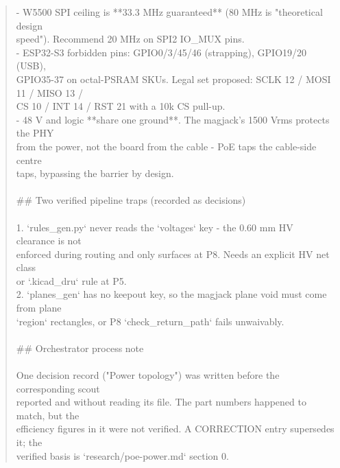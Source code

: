 \documentclass[11pt,a4paper]{article}
\begin{document}
\begin{quote}
- W5500 SPI ceiling is {*}{*}33.3 MHz guaranteed{*}{*} (80 MHz is "theoretical design\\
  speed"). Recommend 20 MHz on SPI2 IO\_MUX pins.\\
- ESP32-S3 forbidden pins: GPIO0/3/45/46 (strapping), GPIO19/20 (USB),\\
  GPIO35-37 on octal-PSRAM SKUs. Legal set proposed: SCLK 12 / MOSI 11 / MISO 13 /\\
  CS 10 / INT 14 / RST 21 with a 10k CS pull-up.\\
- 48 V and logic {*}{*}share one ground{*}{*}. The magjack's 1500 Vrms protects the PHY\\
  from the power, not the board from the cable - PoE taps the cable-side centre\\
  taps, bypassing the barrier by design.\\
~\\
\#\# Two verified pipeline traps (recorded as decisions)\\
~\\
1. `rules\_gen.py` never reads the `voltages` key - the 0.60 mm HV clearance is not\\
   enforced during routing and only surfaces at P8. Needs an explicit HV net class\\
   or `.kicad\_dru` rule at P5.\\
2. `planes\_gen` has no keepout key, so the magjack plane void must come from plane\\
   `region` rectangles, or P8 `check\_return\_path` fails unwaivably.\\
~\\
\#\# Orchestrator process note\\
~\\
One decision record ("Power topology") was written before the corresponding scout\\
reported and without reading its file. The part numbers happened to match, but the\\
efficiency figures in it were not verified. A CORRECTION entry supersedes it; the\\
verified basis is `research/poe-power.md` section 0.
\end{quote}
\end{document}
